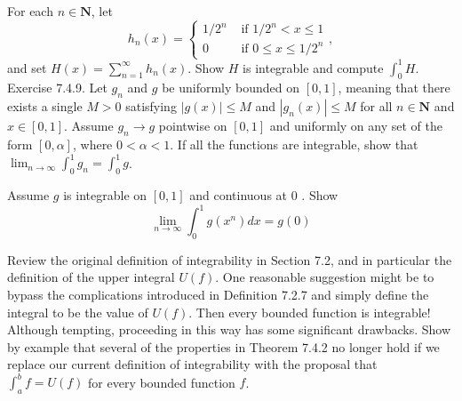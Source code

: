 \begin{exercise} For each $n \in \mathbf{N}$, let
$$
h_{n}(x)=\left\{\begin{array}{ll}
1 / 2^{n} & \text { if } 1 / 2^{n}<x \leq 1 \\
0 & \text { if } 0 \leq x \leq 1 / 2^{n}
\end{array},\right.
$$
and set $H(x)=\sum_{n=1}^{\infty} h_{n}(x)$. Show $H$ is integrable and compute $\int_{0}^{1} H$. Exercise 7.4.9. Let $g_{n}$ and $g$ be uniformly bounded on $[0,1]$, meaning that there exists a single $M>0$ satisfying $|g(x)| \leq M$ and $\left|g_{n}(x)\right| \leq M$ for all $n \in \mathbf{N}$ and $x \in[0,1]$. Assume $g_{n} \rightarrow g$ pointwise on $[0,1]$ and uniformly on any set of the form $[0, \alpha]$, where $0<\alpha<1$.
If all the functions are integrable, show that $\lim _{n \rightarrow \infty} \int_{0}^{1} g_{n}=\int_{0}^{1} g$.
\end{exercise}
\begin{solution}
    \TODO
\end{solution}

\begin{exercise} Assume $g$ is integrable on $[0,1]$ and continuous at 0 . Show
$$
\lim _{n \rightarrow \infty} \int_{0}^{1} g\left(x^{n}\right) d x=g(0)
$$
\end{exercise}
\begin{solution}
    \TODO
\end{solution}

\begin{exercise}
Review the original definition of integrability in Section 7.2, and in particular the definition of the upper integral $U(f)$. One reasonable suggestion might be to bypass the complications introduced in Definition 7.2.7 and simply define the integral to be the value of $U(f)$. Then every bounded function is integrable! Although tempting, proceeding in this way has some significant drawbacks. Show by example that several of the properties in Theorem 7.4.2 no longer hold if we replace our current definition of integrability with the proposal that $\int_{a}^{b} f=U(f)$ for every bounded function $f$.
\end{exercise}
\begin{solution}
    \TODO
\end{solution}

